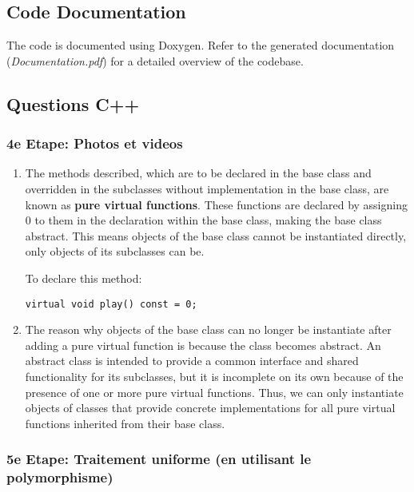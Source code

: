 \documentclass[
]{article}
\begin{document}
\subsection{Code Documentation}\label{code-documentation}

The code is documented using Doxygen. Refer to the generated
documentation (\emph{Documentation.pdf}) for a detailed overview of the
codebase.

\subsection{Questions C++}\label{questions-c}

\subsubsection{4e Etape: Photos et
videos}\label{e-etape-photos-et-videos}

\begin{enumerate}
\def\labelenumi{\arabic{enumi}.}
\item
  The methods described, which are to be declared in the base class and
  overridden in the subclasses without implementation in the base class,
  are known as \textbf{pure virtual functions}. These functions are
  declared by assigning 0 to them in the declaration within the base
  class, making the base class abstract. This means objects of the base
  class cannot be instantiated directly, only objects of its subclasses
  can be.

  To declare this method:

  \texttt{virtual\ void\ play()\ const\ =\ 0;}
\item
  The reason why objects of the base class can no longer be instantiate
  after adding a pure virtual function is because the class becomes
  abstract. An abstract class is intended to provide a common interface
  and shared functionality for its subclasses, but it is incomplete on
  its own because of the presence of one or more pure virtual functions.
  Thus, we can only instantiate objects of classes that provide concrete
  implementations for all pure virtual functions inherited from their
  base class.
\end{enumerate}

\subsubsection{5e Etape: Traitement uniforme (en utilisant le
polymorphisme)}\label{e-etape-traitement-uniforme-en-utilisant-le-polymorphisme}
\end{document}
